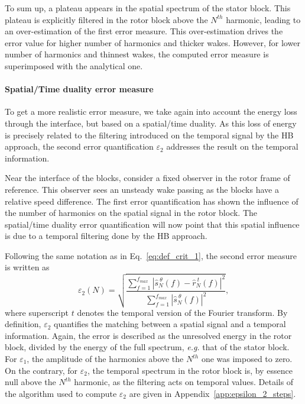 To sum up, a plateau appears in the spatial spectrum of the
stator block. This plateau is explicitly filtered in the
rotor block above the $N^{th}$ harmonic, leading to an over-estimation of the 
first error measure. This over-estimation drives the error value
for higher number of harmonics and thicker wakes.
However, for lower number of harmonics and thinnest wakes, 
the computed error measure is superimposed with 
the analytical one.

\FloatBarrier

\paragraph{Spatial/Time duality error measure}
To get a more realistic error measure, we take 
again into account the energy loss
through the interface, but based on a spatial/time duality. 
As this loss of energy is 
precisely related to the filtering 
introduced on the temporal signal by the HB approach, the second 
error quantification $\varepsilon_2$ addresses the result on 
the temporal information. 

Near the interface of the blocks, consider a fixed observer in
the rotor frame of reference. This observer sees an unsteady 
wake passing as the blocks have a relative speed difference.
The first error quantification has shown the 
influence of the number of harmonics on the spatial signal 
in the rotor block. The spatial/time 
duality error quantification will now
point that this spatial influence is due to a temporal filtering done by
the HB approach.

Following the same notation as in Eq.~\eqref{eq:def_crit_1}, 
the second error measure is written as
\begin{equation}
    \varepsilon_2(N) = \sqrt{
    \frac{\sum_{f=1}^{f_{max}} | \widehat{s}^{~\theta}_N (f) - 
      \widehat{r}^{~t}_N (f)|^2}{ 
    \sum_{f=1}^{f_{max}} | \widehat{s}^{~\theta}_N (f)|^2}},
    \label{eq:def_crit_2}
\end{equation}
where superscript $t$ denotes the temporal version of
the Fourier transform.
By definition, $\varepsilon_2$
quantifies the matching between a spatial signal
and a temporal information.
Again, the error is described as the unresolved energy 
in the rotor block, 
divided by the energy of the full spectrum, 
\emph{e.g.} that of the stator block. 
For $\varepsilon_1$, the amplitude 
of the harmonics above the $N^{th}$ one was imposed to zero. 
On the contrary, for $\varepsilon_2$, the temporal spectrum 
in the rotor block is, 
by essence null above the $N^{th}$ harmonic, as the filtering 
acts on temporal values. 
Details of the algorithm used to compute $\varepsilon_2$ 
are given in Appendix~\ref{app:epsilon_2_steps}.

